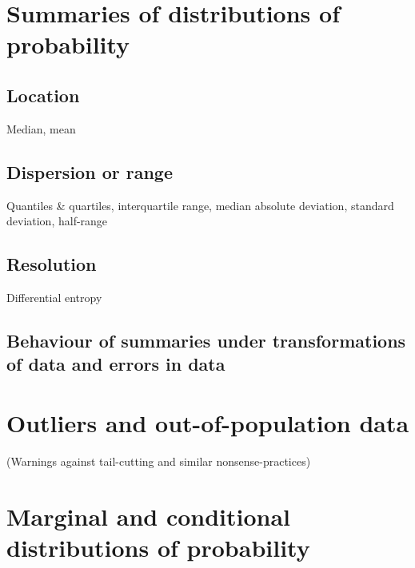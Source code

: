 \documentclass[
  a4paper,
  DIV=11,
  numbers=noendperiod,
  oneside]{scrreprt}
\begin{document}
\hypertarget{summaries-of-distributions-of-probability}{%
\section{Summaries of distributions of
probability}\label{summaries-of-distributions-of-probability}}

\hypertarget{location}{%
\subsection{Location}\label{location}}

Median, mean

\hypertarget{dispersion-or-range}{%
\subsection{Dispersion or range}\label{dispersion-or-range}}

Quantiles \& quartiles, interquartile range, median absolute deviation,
standard deviation, half-range

\hypertarget{resolution}{%
\subsection{Resolution}\label{resolution}}

Differential entropy

\hypertarget{behaviour-of-summaries-under-transformations-of-data-and-errors-in-data}{%
\subsection{Behaviour of summaries under transformations of data and
errors in
data}\label{behaviour-of-summaries-under-transformations-of-data-and-errors-in-data}}

\hypertarget{outliers-and-out-of-population-data}{%
\section{Outliers and out-of-population
data}\label{outliers-and-out-of-population-data}}

(Warnings against tail-cutting and similar nonsense-practices)

\hypertarget{marginal-and-conditional-distributions-of-probability}{%
\section{Marginal and conditional distributions of
probability}\label{marginal-and-conditional-distributions-of-probability}}
\end{document}
